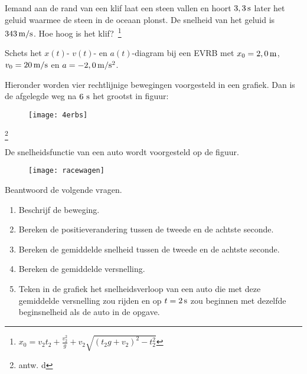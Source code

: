 \begin{exercise} Iemand aan de rand van een klif laat een steen vallen en hoort
$3,3\rm\,s$ later het geluid waarmee de steen in de oceaan plonst.
De snelheid van het geluid is $343\rm\,m/s$. Hoe hoog is het
klif?~\footnote{$x_0=v_2t_2+\frac{v_2^2}{g}+v_2\sqrt{(t_2g+v_2)^2-t_2^2}$}


\end{exercise}

\begin{exercise} Schets het $x(t)$- $v(t)$- en $a(t)$-diagram bij een EVRB met $x_0=2,0\rm\,m$, $v_0=20\rm\,m/s$ en $a=-2,0\rm\,m/s^2$.

\end{exercise}

\begin{exercise} Hieronder worden vier rechtlijnige bewegingen voorgesteld in een grafiek. Dan is de afgelegde weg na $6~\rm s$ het grootst in figuur:
\begin{figure}[h]
\begin{center}
\texttt{[image: 4erbs]}
\end{center}
\end{figure}
\footnote{antw. d}


\end{exercise}

\begin{exercise} De snelheidsfunctie van een auto wordt voorgesteld op de figuur. 
\begin{figure}[h]
\centering
\texttt{[image: racewagen]}
\end{figure}
\newline
Beantwoord de volgende vragen.
\begin{enumerate}
\item Beschrijf de beweging. 
\item Bereken de positieverandering tussen de tweede en de achtste seconde. 
\item Bereken de gemiddelde snelheid tussen de tweede en de achtste seconde. 
\item Bereken de gemiddelde versnelling. 
\item Teken in de grafiek het snelheidsverloop van een auto die met deze gemiddelde versnelling
zou rijden en op $t=2\rm\,s$ zou beginnen met dezelfde beginsnelheid als de auto in de opgave.
\end{enumerate}



\end{exercise}

